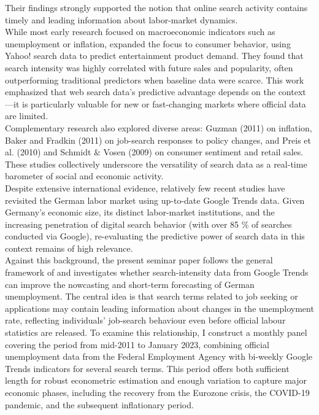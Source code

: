 \documentclass[12pt,a4paper]{article}
\begin{document}
Their findings strongly supported the notion that online search activity contains timely and leading information about labor-market dynamics.
\\
While most early research focused on macroeconomic indicators such as unemployment or inflation, \textcite{goel} expanded the focus to consumer behavior, using Yahoo! search data to predict entertainment product demand.
They found that search intensity was highly correlated with future sales and popularity, often outperforming traditional predictors when baseline data were scarce. This work emphasized that web search data’s predictive advantage depends on the context—it is particularly valuable for new or fast-changing markets where official data are limited.\\
Complementary research also explored diverse areas: Guzman (2011) on inflation, Baker and Fradkin (2011) on job-search responses to policy changes, and Preis et al. (2010) and Schmidt \& Vosen (2009) on consumer sentiment and retail sales.
These studies collectively underscore the versatility of search data as a real-time barometer of social and economic activity.\\
Despite extensive international evidence, relatively few recent studies have revisited the German labor market using up-to-date Google Trends data.
Given Germany’s economic size, its distinct labor-market institutions, and the increasing penetration of digital search behavior (with over 85 \% of searches conducted via Google), re-evaluating the predictive power of search data in this context remains of high relevance.\\
Against this background, the present seminar paper follows the general framework of \textcite{Zimmermann2012} and investigates whether search-intensity data from Google Trends can improve the nowcasting and short-term forecasting of German unemployment. The central idea is that search terms related to job seeking or applications may contain leading information about changes in the unemployment rate, reflecting individuals’ job-search behaviour even before official labour statistics are released.
To examine this relationship, I construct a monthly panel covering the period from mid-2011 to January 2023, combining official unemployment data from the Federal Employment Agency with bi-weekly Google Trends indicators for several search terms.
This period offers both sufficient length for robust econometric estimation and enough variation to capture major economic phases, including the recovery from the Eurozone crisis, the COVID-19 pandemic, and the subsequent inflationary period.
\end{document}
